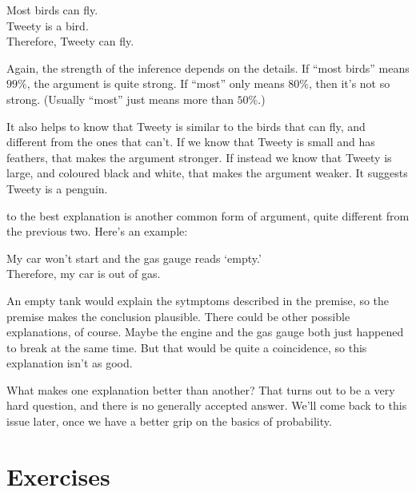 \documentclass[justified]{tufte-book}
\theoremstyle{definition}
\theoremstyle{definition}
\theoremstyle{definition}
\theoremstyle{definition}
\theoremstyle{remark}
\begin{document}
\begin{argument}
Most birds can fly.\\
Tweety is a bird.\\
Therefore, Tweety can fly.
\end{argument}

Again, the strength of the inference depends on the details. If ``most birds'' means \(99\%\), the argument is quite strong. If ``most'' only means \(80\%\), then it's not so strong. (Usually ``most'' just means more than \(50\%\).)

It also helps to know that Tweety is similar to the birds that can fly, and different from the ones that can't. If we know that Tweety is small and has feathers, that makes the argument stronger. If instead we know that Tweety is large, and coloured black and white, that makes the argument weaker. It suggests Tweety is a penguin.

 to the best explanation is another common form of argument, quite different from the previous two. Here's an example:

\begin{argument}
My car won't start and the gas gauge reads `empty.'\\
Therefore, my car is out of gas.
\end{argument}

An empty tank would explain the sytmptoms described in the premise, so the premise makes the conclusion plausible. There could be other possible explanations, of course. Maybe the engine and the gas gauge both just happened to break at the same time. But that would be quite a coincidence, so this explanation isn't as good.

What makes one explanation better than another? That turns out to be a very hard question, and there is no generally accepted answer. We'll come back to this issue later, once we have a better grip on the basics of probability.

\hypertarget{exercises-1}{%
\section*{Exercises}\label{exercises-1}}
\end{document}
